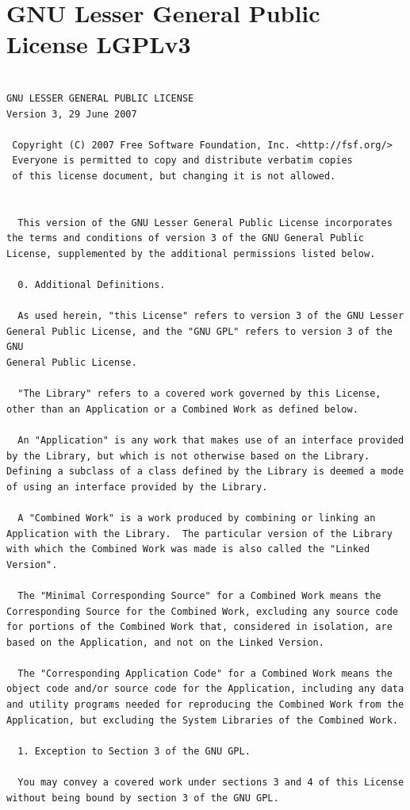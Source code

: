 \documentclass[10pt, headsepline,DIV14,BCOR0.5cm]{scrreprt}
\begin{document}
\section{GNU Lesser General Public License LGPLv3}
\begin{lstlisting}

GNU LESSER GENERAL PUBLIC LICENSE
Version 3, 29 June 2007

 Copyright (C) 2007 Free Software Foundation, Inc. <http://fsf.org/>
 Everyone is permitted to copy and distribute verbatim copies
 of this license document, but changing it is not allowed.


  This version of the GNU Lesser General Public License incorporates
the terms and conditions of version 3 of the GNU General Public
License, supplemented by the additional permissions listed below.

  0. Additional Definitions.

  As used herein, "this License" refers to version 3 of the GNU Lesser
General Public License, and the "GNU GPL" refers to version 3 of the GNU
General Public License.

  "The Library" refers to a covered work governed by this License,
other than an Application or a Combined Work as defined below.

  An "Application" is any work that makes use of an interface provided
by the Library, but which is not otherwise based on the Library.
Defining a subclass of a class defined by the Library is deemed a mode
of using an interface provided by the Library.

  A "Combined Work" is a work produced by combining or linking an
Application with the Library.  The particular version of the Library
with which the Combined Work was made is also called the "Linked
Version".

  The "Minimal Corresponding Source" for a Combined Work means the
Corresponding Source for the Combined Work, excluding any source code
for portions of the Combined Work that, considered in isolation, are
based on the Application, and not on the Linked Version.

  The "Corresponding Application Code" for a Combined Work means the
object code and/or source code for the Application, including any data
and utility programs needed for reproducing the Combined Work from the
Application, but excluding the System Libraries of the Combined Work.

  1. Exception to Section 3 of the GNU GPL.

  You may convey a covered work under sections 3 and 4 of this License
without being bound by section 3 of the GNU GPL.


\end{lstlisting}
\end{document}

